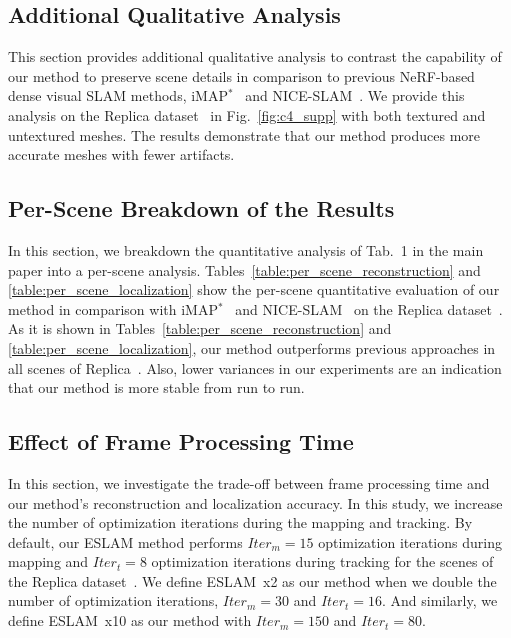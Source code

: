 \subsection{Additional Qualitative Analysis}

This section provides additional qualitative analysis to contrast the capability of our method to preserve scene details in comparison to previous NeRF-based dense visual SLAM methods, iMAP$^*$~\cite{sucar2021imap} and NICE-SLAM~\cite{zhu2022nice}. We provide this analysis on the Replica dataset~\cite{replica19arxiv} in Fig.~\ref{fig:c4_supp} with both textured and untextured meshes. The results demonstrate that our method produces more accurate meshes with fewer artifacts.

\subsection{Per-Scene Breakdown of the Results}

In this section, we breakdown the quantitative analysis of Tab.~1 in the main paper into a per-scene analysis. Tables~\ref{table:per_scene_reconstruction} and \ref{table:per_scene_localization} show the per-scene quantitative evaluation of our method in comparison with iMAP$^*$~\cite{sucar2021imap} and NICE-SLAM~\cite{zhu2022nice} on the Replica dataset~\cite{replica19arxiv}. As it is shown in Tables~\ref{table:per_scene_reconstruction} and \ref{table:per_scene_localization}, our method outperforms previous approaches in all scenes of Replica~\cite{replica19arxiv}. Also, lower variances in our experiments are an indication that our method is more stable from run to run.

\subsection{Effect of Frame Processing Time} \label{sec:c4_iters}

In this section, we investigate the trade-off between frame processing time and our method's reconstruction and localization accuracy. In this study, we increase the number of optimization iterations during the mapping and tracking. By default, our ESLAM method performs $Iter_{m}=15$ optimization iterations during mapping and $Iter_{t}=8$ optimization iterations during tracking for the scenes of the Replica dataset~\cite{replica19arxiv}. We define ESLAM~x2 as our method when we double the number of optimization iterations, \ie $Iter_{m}=30$ and $Iter_{t}=16$. And similarly, we define ESLAM~x10 as our method with $Iter_{m}=150$ and $Iter_{t}=80$.


